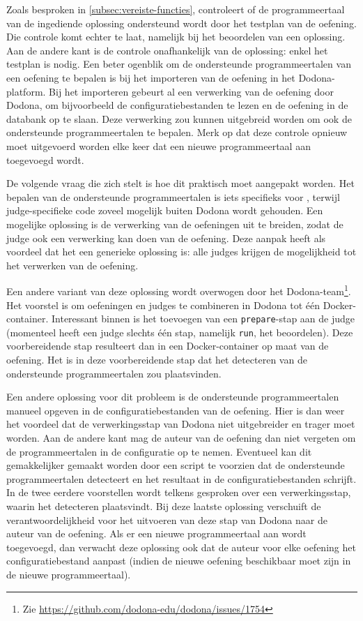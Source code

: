 Zoals besproken in \cref{subsec:vereiste-functies}, controleert \tested{} of de programmeertaal van de ingediende oplossing ondersteund wordt door het testplan van de oefening.
Die controle komt echter te laat, namelijk bij het beoordelen van een oplossing.
Aan de andere kant is de controle onafhankelijk van de oplossing: enkel het testplan is nodig.
Een beter ogenblik om de ondersteunde programmeertalen van een oefening te bepalen is bij het importeren van de oefening in het Dodona-platform.
Bij het importeren gebeurt al een verwerking van de oefening door Dodona, om bijvoorbeeld de configuratiebestanden te lezen en de oefening in de databank op te slaan.
Deze verwerking zou kunnen uitgebreid worden om ook de ondersteunde programmeertalen te bepalen.
Merk op dat deze controle opnieuw moet uitgevoerd worden elke keer dat een nieuwe programmeertaal aan \tested{} toegevoegd wordt.

De volgende vraag die zich stelt is hoe dit praktisch moet aangepakt worden.
Het bepalen van de ondersteunde programmeertalen is iets specifieks voor \tested{}, terwijl judge-specifieke code zoveel mogelijk buiten Dodona wordt gehouden.
Een mogelijke oplossing is de verwerking van de oefeningen uit te breiden, zodat de judge ook een verwerking kan doen van de oefening.
Deze aanpak heeft als voordeel dat het een generieke oplossing is: alle judges krijgen de mogelijkheid tot het verwerken van de oefening.

Een andere variant van deze oplossing wordt overwogen door het Dodona-team\footnote{Zie \url{https://github.com/dodona-edu/dodona/issues/1754}}.
Het voorstel is om oefeningen en judges te combineren in Dodona tot één Docker-container.
Interessant binnen \tested{} is het toevoegen van een \texttt{prepare}-stap aan de judge (momenteel heeft een judge slechts één stap, namelijk \texttt{run}, het beoordelen).
Deze voorbereidende stap resulteert dan in een Docker-container op maat van de oefening.
Het is in deze voorbereidende stap dat het detecteren van de ondersteunde programmeertalen zou plaatsvinden.

Een andere oplossing voor dit probleem is de ondersteunde programmeertalen manueel opgeven in de configuratiebestanden van de oefening.
Hier is dan weer het voordeel dat de verwerkingsstap van Dodona niet uitgebreider en trager moet worden.
Aan de andere kant mag de auteur van de oefening dan niet vergeten om de programmeertalen in de configuratie op te nemen.
Eventueel kan dit gemakkelijker gemaakt worden door een script te voorzien dat de ondersteunde programmeertalen detecteert en het resultaat in de configuratiebestanden schrijft.
In de twee eerdere voorstellen wordt telkens gesproken over een verwerkingsstap, waarin het detecteren plaatsvindt.
Bij deze laatste oplossing verschuift de verantwoordelijkheid voor het uitvoeren van deze stap van Dodona naar de auteur van de oefening.
Als er een nieuwe programmeertaal aan \tested{} wordt toegevoegd, dan verwacht deze oplossing ook dat de auteur voor elke oefening het configuratiebestand aanpast (indien de nieuwe oefening beschikbaar moet zijn in de nieuwe programmeertaal).

